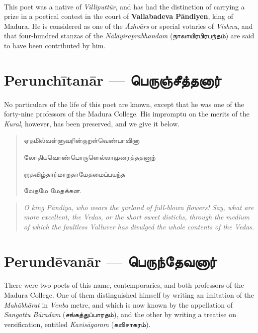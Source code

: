 \documentclass{article}
\newcommand{\TamilText}[1]{\texttamil{#1}}
\newcommand{\TamilBold}[1]{\texttamil{\textbf{#1}}}
\newcommand{\tam}[1]{\TamilText{#1}}
\newcommand{\tambold}[1]{\TamilBold{#1}}
\begin{document}
\paragraph{}
This poet was a native of \emph{Villiputt\={u}r}, and has had the distinction of carrying a prize in a poetical contest in the court of \textbf{Vallabadeva P\={a}ndiyen}, king of Madura. He is considered as one of the \emph{\={A}zhv\={a}rs} or special votaries of \emph{Vishnu}, and that four-hundred stanzas of the \emph{N\={a}l\={a}yiraprabhandam} (\tam{நாலாயிரபிரபந்தம்}) are said to have been contributed by him.

\section{Perunch\={i}tan\={a}r --- \tambold{பெருஞ்சீத்தனார்}}
\paragraph{}
No particulars of the life of this poet are known, except that he was one of the forty-nine professors of the Madura College. His impromptu on the merits of the \emph{Kural}, however, has been preserved, and we give it below.
\begin{quotation}\small
\tam{ஏதமில்வள்ளுவரின்குறள்வெண்பாவினா}

\tam{லோதியவொண்பொருளெல்லாமுரைத்ததனாற்}

\tam{றாதவிழ்தார்மாறதாமேதமைப்பயந்த}

\tam{வேதமே மேதக்கன}.
\end{quotation}
\begin{quotation}\small
\emph{O king P\={a}ndiya, who wears the garland of full-blown flowers! Say, what are more excellent, the Vedas, or the short sweet distichs, through the medium of which the faultless Valluver has divulged the whole contents of the Vedas.}
\end{quotation}

\section{Perund\={e}van\={a}r --- \tambold{பெருந்தேவனார்}}
\paragraph{}
There were two poets of this name, contemporaries, and both professors of the Madura College. One of them distinguished himself by writing an imitation of the \emph{Mah\={a}bh\={a}rat} in \emph{Venba} metre, and which is now known by the appellation of \emph{Sangattu B\={a}radam} (\tam{சங்கத்துப்பாரதம்}), and the other by writing a treatise on versification, entitled \emph{Kavis\={a}garam} (\tam{கவிசாகரம்}).
\end{document}
